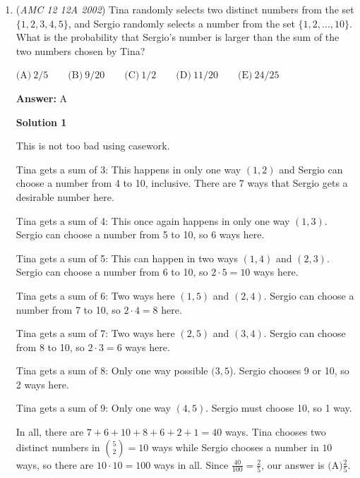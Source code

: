 \begin{enumerate}
 Now we can set the expression equal to $64$ (because of what we determined in the $1$st step): $x+x+x+8+8+8+8+x+8=64$

 Simplyifying, 

 $4x+40=64$
$4x=24$
$x=6$

 Therefore, since $x$ is the smallest number in the set, the largest number in the set will be $x+8$, which is $\boxed{\text{(D)}\ 14 }$.

 


	\item (\textit{AMC 12 12A 2002}) Tina randomly selects two distinct numbers from the set $\{1, 2, 3, 4, 5\}$, and Sergio randomly selects a number from the set $\{1, 2, \ldots, 10\}$. What is the probability that Sergio's number is larger than the sum of the two numbers chosen by Tina? 


 $\text{(A)}\ 2/5 \qquad \text{(B)}\ 9/20 \qquad \text{(C)}\ 1/2 \qquad \text{(D)}\ 11/20 \qquad \text{(E)}\ 24/25$

 \textbf{Answer: }A



\textbf{Solution 1}

This is not too bad using casework. 

 Tina gets a sum of 3: This happens in only one way $(1,2)$ and Sergio can choose a number from 4 to 10, inclusive. There are 7 ways that Sergio gets a desirable number here.

 Tina gets a sum of 4: This once again happens in only one way $(1,3)$. Sergio can choose a number from 5 to 10, so 6 ways here.

 Tina gets a sum of 5: This can happen in two ways $(1,4)$ and $(2,3)$. Sergio can choose a number from 6 to 10, so $2\cdot5=10$ ways here.

 Tina gets a sum of 6: Two ways here $(1,5)$ and $(2,4)$. Sergio can choose a number from 7 to 10, so $2\cdot4=8$ here.

 Tina gets a sum of 7: Two ways here $(2,5)$ and $(3,4)$. Sergio can choose from 8 to 10, so $2\cdot3=6$ ways here.

 Tina gets a sum of 8: Only one way possible $(3,5$). Sergio chooses 9 or 10, so 2 ways here.

 Tina gets a sum of 9: Only one way $(4,5)$. Sergio must choose 10, so 1 way.

 In all, there are $7+6+10+8+6+2+1=40$ ways. Tina chooses two distinct numbers in $\binom{5}{2}=10$ ways while Sergio chooses a number in $10$ ways, so there are $10\cdot 10=100$ ways in all. Since $\frac{40}{100}=\frac{2}{5}$, our answer is $\boxed{\text{(A)}\frac{2}{5}}$.


\end{enumerate}
